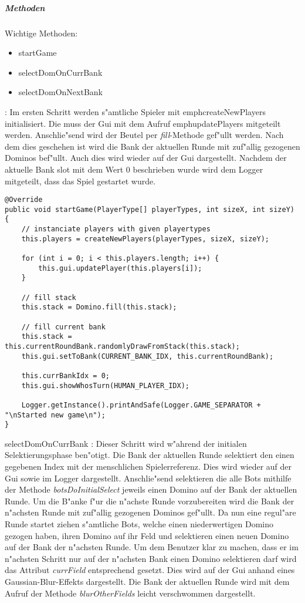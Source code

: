 \subparagraph{Methoden}
Wichtige Methoden: 
\begin{itemize}
	\item startGame
	\item selectDomOnCurrBank
	\item selectDomOnNextBank
\end{itemize}

: Im ersten Schritt werden s"amtliche Spieler mit emph{createNewPlayers} initialisiert. Die muss der Gui mit dem Aufruf emph{updatePlayers} mitgeteilt werden. Anschlie"send wird der Beutel per \emph{fill}-Methode gef"ullt werden. Nach dem dies geschehen ist wird die Bank der aktuellen Runde mit zuf"allig gezogenen Dominos bef"ullt. Auch dies wird wieder auf der Gui dargestellt. Nachdem der aktuelle Bank slot mit dem Wert 0 beschrieben wurde wird dem Logger mitgeteilt, dass das Spiel gestartet wurde. 

\begin{lstlisting}[float,style=CodeHighlighting,label=game_startGame,caption=Game - startGame]
@Override
public void startGame(PlayerType[] playerTypes, int sizeX, int sizeY) {
    // instanciate players with given playertypes
    this.players = createNewPlayers(playerTypes, sizeX, sizeY);

    for (int i = 0; i < this.players.length; i++) {
        this.gui.updatePlayer(this.players[i]);
    }

    // fill stack
    this.stack = Domino.fill(this.stack);

    // fill current bank
    this.stack = this.currentRoundBank.randomlyDrawFromStack(this.stack);
    this.gui.setToBank(CURRENT_BANK_IDX, this.currentRoundBank);

    this.currBankIdx = 0;
    this.gui.showWhosTurn(HUMAN_PLAYER_IDX);

    Logger.getInstance().printAndSafe(Logger.GAME_SEPARATOR + "\nStarted new game\n");
}
\end{lstlisting}

selectDomOnCurrBank : Dieser Schritt wird w"ahrend der initialen Selektierungsphase ben"otigt. Die Bank der aktuellen Runde selektiert den einen gegebenen Index mit der menschlichen Spielerreferenz. Dies wird wieder auf der Gui sowie im Logger dargestellt. Anschlie"send selektieren die alle Bots mithilfe der Methode \emph{botsDoInitialSelect} jeweils einen Domino auf der Bank der aktuellen Runde. Um die B"anke f"ur die n"achste Runde vorzubereiten wird die Bank der n"achsten Runde mit zuf"allig gezogenen Dominos gef"ullt. Da nun eine regul"are Runde startet ziehen s"amtliche Bots, welche einen niederwertigen Domino gezogen haben, ihren Domino auf ihr Feld und selektieren einen neuen Domino auf der Bank der n"achsten Runde. Um dem Benutzer klar zu machen, dass er im n"achsten Schritt nur auf der n"achsten Bank einen Domino selektieren darf wird das Attribut \emph{currField} entsprechend gesetzt. Dies wird auf der Gui anhand eines Gaussian-Blur-Effekts dargestellt. Die Bank der aktuellen Runde wird mit dem Aufruf der Methode \emph{blurOtherFields} leicht verschwommen dargestellt. 

